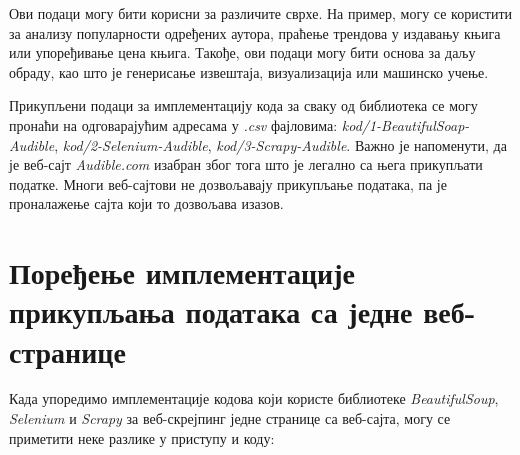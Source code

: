 \documentclass[12pt,oneside]{memoir}
\begin{document}
Ови подаци могу бити корисни за различите сврхе. На пример, могу се користити за анализу популарности одређених аутора, праћење трендова у издавању књига или упоређивање цена књига. Такође, ови подаци могу бити основа за даљу обраду, као што је генерисање извештаја, визуализација или машинско учење.

Прикупљени подаци за имплементацију кода за сваку од библиотека се могу пронаћи на одговарајућим адресама у \textit{.csv} фајловима: \textit{kod/1-BeautifulSoap-Audible}, \textit{kod/2-Selenium-Audible}, \textit{kod/3-Scrapy-Audible}. Важно је напоменути, да је веб-сајт \textit{Audible.com} изабран због тога што је легално са њега прикупљати податке. Многи веб-сајтови не дозвољавају прикупљање података, па је проналажење сајта који то дозвољава изазов. 

\section{Поређење имплементације прикупљања података са једне веб-странице}
Када упоредимо имплементације кодова који користе библиотеке \textit{BeautifulSoup}, \textit{Selenium} и \textit{Scrapy} за веб-скрејпинг једне странице са веб-сајта, могу се приметити неке разлике у приступу и коду:
\end{document}
